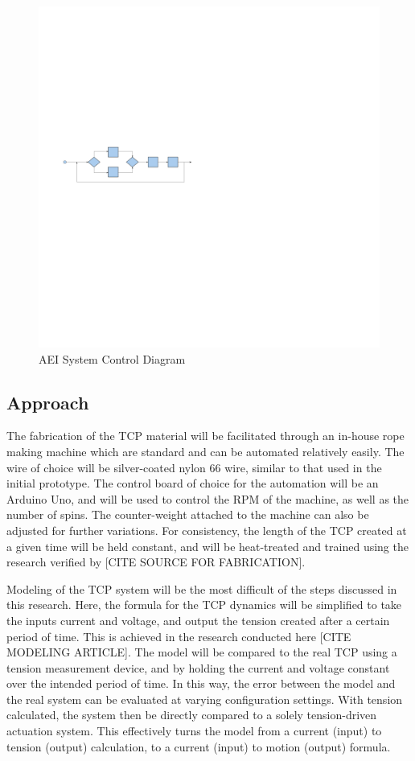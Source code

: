 \begin{figure}[ht]
	\centering
	\includegraphics[scale=0.30]{control_diagram}
	\caption{AEI System Control Diagram}
	\label{fig:control_diagram}
\end{figure}

\subsection{Approach}

The fabrication of the TCP material will be facilitated through an in-house rope making machine which are standard and can be automated relatively easily. The wire of choice will be silver-coated nylon 66 wire, similar to that used in the initial prototype. The control board of choice for the automation will be an Arduino Uno, and will be used to control the RPM of the machine, as well as the number of spins. The counter-weight attached to the machine can also be adjusted for further variations. For consistency, the length of the TCP created at a given time will be held constant, and will be heat-treated and trained using the research verified by [CITE SOURCE FOR FABRICATION].

Modeling of the TCP system will be the most difficult of the steps discussed in this research. Here, the formula for the TCP dynamics will be simplified to take the inputs current and voltage, and output the tension created after a certain period of time. This is achieved in the research conducted here [CITE MODELING ARTICLE]. The model will be compared to the real TCP using a tension measurement device, and by holding the current and voltage constant over the intended period of time. In this way, the error between the model and the real system can be evaluated at varying configuration settings. With tension calculated, the system then be directly compared to a solely tension-driven actuation system. This effectively turns the model from a current (input) to tension (output) calculation, to a current (input) to motion (output) formula.

